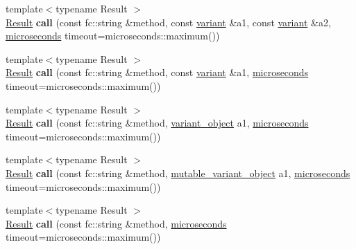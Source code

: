 \begin{Indent}
\begin{DoxyCompactItemize}
\item 
\mbox{\label{classfc_1_1rpc_1_1variant__connection_a30e65265c9cd96ba9322757cf97a76c9}} 
{\footnotesize template$<$typename Result $>$ }\\\mbox{\hyperlink{struct_result}{Result}} {\bfseries call} (const fc\+::string \&method, const \mbox{\hyperlink{classfc_1_1variant}{variant}} \&a1, const \mbox{\hyperlink{classfc_1_1variant}{variant}} \&a2, \mbox{\hyperlink{classfc_1_1microseconds}{microseconds}} timeout=microseconds\+::maximum())
\item 
\mbox{\label{classfc_1_1rpc_1_1variant__connection_a932c4dcb8ad4ee5dcde51bc54d200e2e}} 
{\footnotesize template$<$typename Result $>$ }\\\mbox{\hyperlink{struct_result}{Result}} {\bfseries call} (const fc\+::string \&method, const \mbox{\hyperlink{classfc_1_1variant}{variant}} \&a1, \mbox{\hyperlink{classfc_1_1microseconds}{microseconds}} timeout=microseconds\+::maximum())
\item 
\mbox{\label{classfc_1_1rpc_1_1variant__connection_ad496850b2c60a89f38b9f0b6f48a5a36}} 
{\footnotesize template$<$typename Result $>$ }\\\mbox{\hyperlink{struct_result}{Result}} {\bfseries call} (const fc\+::string \&method, \mbox{\hyperlink{classfc_1_1variant__object}{variant\+\_\+object}} a1, \mbox{\hyperlink{classfc_1_1microseconds}{microseconds}} timeout=microseconds\+::maximum())
\item 
\mbox{\label{classfc_1_1rpc_1_1variant__connection_aeef96ccf72608a67329a6b22c0fa4ad9}} 
{\footnotesize template$<$typename Result $>$ }\\\mbox{\hyperlink{struct_result}{Result}} {\bfseries call} (const fc\+::string \&method, \mbox{\hyperlink{classfc_1_1mutable__variant__object}{mutable\+\_\+variant\+\_\+object}} a1, \mbox{\hyperlink{classfc_1_1microseconds}{microseconds}} timeout=microseconds\+::maximum())
\item 
\mbox{\label{classfc_1_1rpc_1_1variant__connection_a897e300caeff80f6953cb4cc90944603}} 
{\footnotesize template$<$typename Result $>$ }\\\mbox{\hyperlink{struct_result}{Result}} {\bfseries call} (const fc\+::string \&method, \mbox{\hyperlink{classfc_1_1microseconds}{microseconds}} timeout=microseconds\+::maximum())

\end{DoxyCompactItemize}
\end{Indent}
